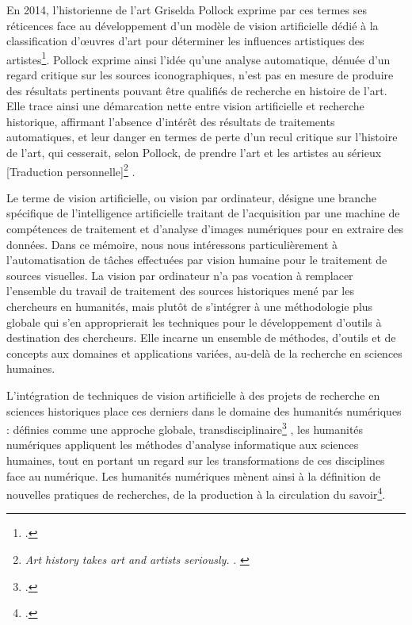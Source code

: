 \documentclass[a4paper,12pt,twoside]{book}
\newcommand{\ia}{intelligence artificielle\xspace}
\begin{document}
	En 2014, l'historienne de l'art Griselda Pollock exprime par ces termes ses réticences face au développement d'un modèle de vision artificielle dédié à la classification d'œuvres d'art pour déterminer les influences artistiques des artistes\footcite{salehAutomatedDiscoveryArtistic2014b}. Pollock exprime ainsi l'idée qu'une analyse automatique, dénuée d'un regard critique sur les sources iconographiques, n'est pas en mesure de produire des résultats pertinents pouvant être qualifiés de recherche en histoire de l'art. Elle trace ainsi une démarcation nette entre vision artificielle et recherche historique, affirmant l'absence d'intérêt des résultats de traitements automatiques, et leur danger en termes de perte d'un recul critique sur l'histoire de l'art, qui cesserait, selon Pollock, de \og prendre l'art et les artistes au sérieux [Traduction personnelle]\footnote{ \textit{\og Art history takes art and artists seriously. \fg}. \cite{pollockComputersCanFind2014}} \fg.
	
	Le terme de vision artificielle, ou vision par ordinateur, désigne une branche spécifique de l'\ia traitant de l'acquisition par une machine de compétences de traitement et d'analyse d'images numériques pour en extraire des données. Dans ce mémoire, nous nous intéressons particulièrement à l'automatisation de tâches effectuées par vision humaine pour le traitement de sources visuelles. La vision par ordinateur n'a pas vocation à remplacer l'ensemble du travail de traitement des sources historiques mené par les chercheurs en humanités, mais plutôt de s'intégrer à une méthodologie plus globale qui s'en approprierait les techniques pour le développement d'outils à destination des chercheurs. Elle incarne un ensemble de méthodes, d'outils et de concepts aux domaines et applications variées, au-delà de la recherche en sciences humaines.
	
	L'intégration de techniques de vision artificielle à des projets de recherche en sciences historiques place ces derniers dans le domaine des humanités numériques : définies comme une \og approche globale, transdisciplinaire\footcite{sinatraHistoireHumanitesNumeriques2014a} \fg, les humanités numériques appliquent les méthodes d'analyse informatique aux sciences humaines, tout en portant un regard sur les transformations de ces disciplines face au numérique. Les humanités numériques mènent ainsi à la définition de nouvelles pratiques de recherches, de la production à la circulation du savoir\footcite{sinatraHistoireHumanitesNumeriques2014a}.\\
	
\end{document}
